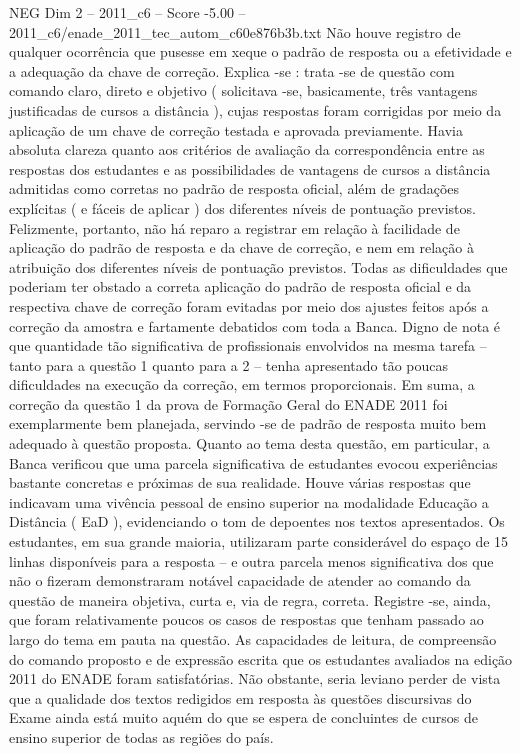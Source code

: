 \begin{textsample}{NEG Dim 2 – 2011\_c6 – Score -5.00 – 2011\_c6/enade\_2011\_tec\_autom\_c60e876b3b.txt}
Não houve registro de qualquer ocorrência que pusesse em xeque o padrão de resposta ou a efetividade e a adequação da chave de correção.
Explica -se : trata -se de questão com comando claro, direto e objetivo ( solicitava -se, basicamente, três vantagens justificadas de cursos a distância ), cujas respostas foram corrigidas por meio da aplicação de um chave de correção testada e aprovada previamente.
Havia absoluta clareza quanto aos critérios de avaliação da correspondência entre as respostas dos estudantes e as possibilidades de vantagens de cursos a distância admitidas como corretas no padrão de resposta oficial, além de gradações explícitas ( e fáceis de aplicar ) dos diferentes níveis de pontuação previstos.
Felizmente, portanto, não há reparo a registrar em relação à facilidade de aplicação do padrão de resposta e da chave de correção, e nem em relação à atribuição dos diferentes níveis de pontuação previstos.
Todas as dificuldades que poderiam ter obstado a correta aplicação do padrão de resposta oficial e da respectiva chave de correção foram evitadas por meio dos ajustes feitos após a correção da amostra e fartamente debatidos com toda a Banca.
Digno de nota é que quantidade tão significativa de profissionais envolvidos na mesma tarefa – tanto para a questão 1 quanto para a 2 – tenha apresentado tão poucas dificuldades na execução da correção, em termos proporcionais.
Em suma, a correção da questão 1 da prova de Formação Geral do ENADE 2011 foi exemplarmente bem planejada, servindo -se de padrão de resposta muito bem adequado à questão proposta.
Quanto ao tema desta questão, em particular, a Banca verificou que uma parcela significativa de estudantes evocou experiências bastante concretas e próximas de sua realidade.
Houve várias respostas que indicavam uma vivência pessoal de ensino superior na modalidade Educação a Distância ( EaD ), evidenciando o tom de depoentes nos textos apresentados.
Os estudantes, em sua grande maioria, utilizaram parte considerável do espaço de 15 linhas disponíveis para a resposta – e outra parcela menos significativa dos que não o fizeram demonstraram notável capacidade de atender ao comando da questão de maneira objetiva, curta e, via de regra, correta.
Registre -se, ainda, que foram relativamente poucos os casos de respostas que tenham passado ao largo do tema em pauta na questão.
As capacidades de leitura, de compreensão do comando proposto e de expressão escrita que os estudantes avaliados na edição 2011 do ENADE foram satisfatórias.
Não obstante, seria leviano perder de vista que a qualidade dos textos redigidos em resposta às questões discursivas do Exame ainda está muito aquém do que se espera de concluintes de cursos de ensino superior de todas as regiões do país.

\end{textsample}
